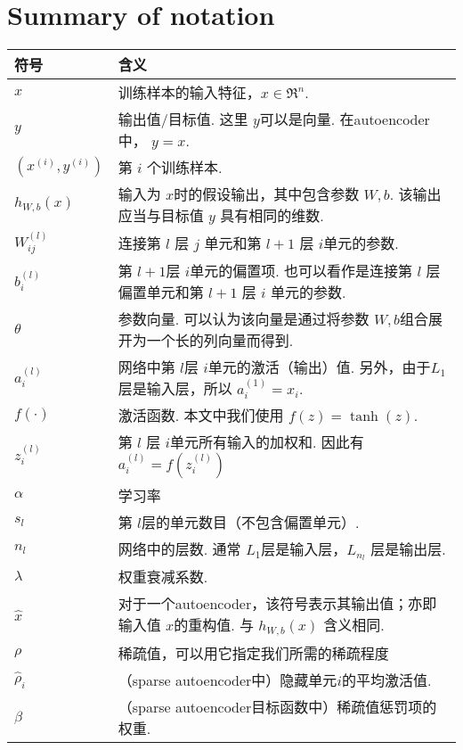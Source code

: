 \section{Summary of notation}
\begin{tabu} to 
\hline

符号 & 含义\nonumber \\ \hline
$x$ & 训练样本的输入特征，$ x \in \Re^{n}$. \nonumber \\ \hline
$y$& 输出值/目标值. 这里 $ y $可以是向量. 在autoencoder中， $y=x$.\nonumber \\ \hline
$(x^{(i)}, y^{(i)})$ &第 $ i$ 个训练样本. \nonumber \\
\hline
$h_{W,b}(x)$&输入为  $x $时的假设输出，其中包含参数 $ W,b$. 该输出应当与目标值 $ y$ 具有相同的维数.
\nonumber \\
\hline
$ W^{(l)}_{ij}$&连接第  $l$ 层 $ j$ 单元和第  $l+1$ 层 $ i $单元的参数.
\nonumber \\
\hline
$b^{(l)}_{i}$&第 $ l+1 $层 $ i $单元的偏置项. 也可以看作是连接第 $ l$ 层偏置单元和第 $ l+1$ 层  $i$ 单元的参数.
\nonumber \\
\hline
$  \theta$&参数向量. 可以认为该向量是通过将参数  $W,b $组合展开为一个长的列向量而得到.
\nonumber \\
\hline
$a^{(l)}_i$&网络中第 $ l $层 $ i $单元的激活（输出）值.
另外，由于$  L_1 $层是输入层，所以 $ a^{(1)}_i = x_i$.
\nonumber \\
\hline
$ f(\cdot)$&激活函数. 本文中我们使用 $ f(z) = \tanh(z)$.
\nonumber \\
\hline
$  z^{(l)}_i$&第 $ l$ 层 $ i $单元所有输入的加权和. 因此有  $a^{(l)}_i = f(z^{(l)}_i)$
\nonumber \\
\hline
$   \alpha$&学习率
\nonumber \\
\hline
$  s_l$&第 $l $层的单元数目（不包含偏置单元）.
\nonumber \\
\hline
$  n_l$&网络中的层数. 通常 $ L_1 $层是输入层，$ L_{n_l}$ 层是输出层.
\nonumber \\
\hline
$   \lambda$&权重衰减系数.
\nonumber \\
\hline
$  \hat{x}$&对于一个autoencoder，该符号表示其输出值；亦即输入值 $ x $的重构值. 与 $ h_{W,b}(x)$ 含义相同.
\nonumber \\
\hline
$  \rho$&稀疏值，可以用它指定我们所需的稀疏程度
\nonumber \\
\hline
$   \hat\rho_i$&（sparse autoencoder中）隐藏单元$  i $的平均激活值.
\nonumber \\
\hline
$  \beta$&（sparse autoencoder目标函数中）稀疏值惩罚项的权重.
\nonumber \\
\hline
\end{tabu}

